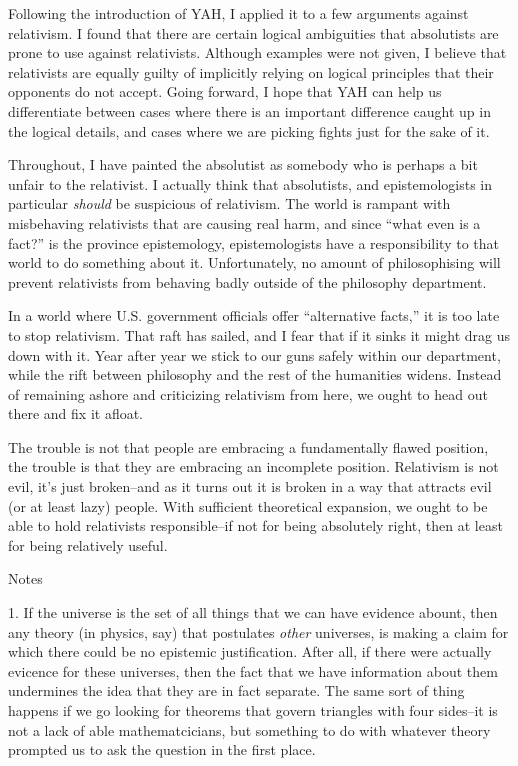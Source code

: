 \documentclass[12pt]{article}
\begin{document}
\begin{flushleft}
Following the introduction of YAH, I applied it to a few arguments against relativism.
I found that there are certain logical ambiguities that absolutists are prone to use against relativists.
Although examples were not given, I believe that relativists are equally guilty of implicitly relying on logical principles that their opponents do not accept.
Going forward, I hope that YAH can help us differentiate between cases where there is an important difference caught up in the logical details, and cases where we are picking fights just for the sake of it.

Throughout, I have painted the absolutist as somebody who is perhaps a bit unfair to the relativist.
I actually think that absolutists, and epistemologists in particular \textit{should} be suspicious of relativism.
The world is rampant with misbehaving relativists that are causing real harm, and since ``what even is a fact?'' is the province epistemology, epistemologists have a responsibility to that world to do something about it.
Unfortunately, no amount of philosophising will prevent relativists from behaving badly outside of the philosophy department.

In a world where U.S. government officials offer ``alternative facts,'' it is too late to stop relativism.
That raft has sailed, and I fear that if it sinks it might drag us down with it.
Year after year we stick to our guns safely within our department, while the rift between philosophy and the rest of the humanities widens.
Instead of remaining ashore and criticizing relativism from here, we ought to head out there and fix it afloat.

The trouble is not that people are embracing a fundamentally flawed position, the trouble is that they are embracing an incomplete position.
Relativism is not evil, it's just broken--and as it turns out it is broken in a way that attracts evil (or at least lazy) people.
With sufficient theoretical expansion, we ought to be able to hold relativists responsible--if not for being absolutely right, then at least for being relatively useful.

\clearpage
\begin{center}
    Notes
\end{center}
\setlength{\parindent}{0.5in}

1. If the universe is the set of all things that we can have evidence abount, then any theory (in physics, say) that postulates \textit{other} universes, is making a claim for which there could be no epistemic justification.  After all, if there were actually evicence for these universes, then the fact that we have information about them undermines the idea that they are in fact separate.  The same sort of thing happens if we go looking for theorems that govern triangles with four sides--it is not a lack of able mathematcicians, but something to do with whatever theory prompted us to ask the question in the first place.


\end{flushleft}
\end{document}
